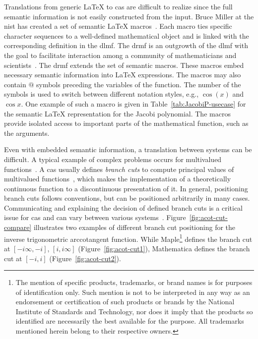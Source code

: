 \documentclass[a4paper,11pt]{article}
\newcommand{\Maple}{Maple}
\newcommand{\Mathematica}{Mathematica}
\theoremstyle{defTheoStyle}
\theoremstyle{defExampStyle}
\DeclareRobustCommand{\iunit}{{i}}
\begin{document}
Translations from generic \LaTeX{} to \gls*{cas} are difficult to realize since the full semantic information is not easily constructed from the input. Bruce Miller at the \gls*{nist} has created a set of semantic \LaTeX{} macros~\parencite{DLMF:Macros}. Each macro ties specific character sequences to a well-defined mathematical object and is linked with the corresponding definition in the \gls*{dlmf}. The \gls*{drmf} is an outgrowth of the \gls*{dlmf} with the goal to facilitate interaction among a community of mathematicians and scientists~\parencites{DRMF:14}{DRMF:15}. The \gls*{drmf} extends the set of semantic macros. These macros embed necessary semantic information into \LaTeX{} expressions. The macros may also contain $@$ symbols preceding the variables of the function. The number of the symbols is used to switch between different notation styles, e.g., $\cos(x)$ and $\cos x$. One example of such a macro is given in Table~\ref{tab:JacobiP-usecase} for the semantic \LaTeX{} representation for the Jacobi polynomial. The macros provide isolated access to important parts of the mathematical function, such as the arguments. 

Even with embedded semantic information, a translation between systems can be difficult. A typical example of complex problems occurs for multivalued functions~\parencite{AISC:MultivaluedFunctions}. A \gls*{cas} usually defines \textit{branch cuts} to compute principal values of multivalued functions~\parencite{Maple:Cuts}, which makes the implementation of a theoretically continuous function to a discontinuous presentation of it. In general, positioning branch cuts follows conventions, but can be positioned arbitrarily in many cases. Communicating and explaining the decision of defined branch cuts is a critical issue for \gls*{cas} and can vary between various systems~\parencite{Branches:acot}. Figure~\ref{fig:acot-cut-compare} illustrates two examples of different branch cut positioning for the inverse trigonometric arccotangent function. While \Maple{}\footnote{The mention of
specific products, trademarks, or brand
names is for purposes of identification only. Such mention is not to be interpreted
in any way as an endorsement or certification of such products or brands by the
National Institute of Standards and Technology, nor does it imply that the products
so identified are necessarily the best available for the purpose. All trademarks
mentioned herein belong to their respective owners.} defines the branch cut at ${[-\iunit\infty, -\iunit]}$, ${[\iunit,\iunit\infty]}$ (Figure~\ref{fig:acot-cut1}), \Mathematica{} defines the branch cut at ${[-\iunit, \iunit]}$ (Figure~\ref{fig:acot-cut2}).
\end{document}
